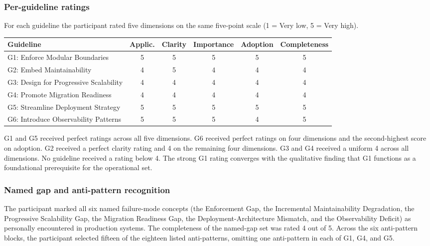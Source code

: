 \subsubsection*{Per-guideline ratings}

For each guideline the participant rated five dimensions on the same five-point scale (1 = Very low, 5 = Very high).

\begin{longtable}{p{5cm} c c c c c}
\toprule
\textbf{Guideline} & \textbf{Applic.} & \textbf{Clarity} & \textbf{Importance} & \textbf{Adoption} & \textbf{Completeness} \\
\midrule
\endhead
G1: Enforce Modular Boundaries  & 5 & 5 & 5 & 5 & 5 \\
G2: Embed Maintainability       & 4 & 5 & 4 & 4 & 4 \\
G3: Design for Progressive Scalability & 4 & 4 & 4 & 4 & 4 \\
G4: Promote Migration Readiness & 4 & 4 & 4 & 4 & 4 \\
G5: Streamline Deployment Strategy & 5 & 5 & 5 & 5 & 5 \\
G6: Introduce Observability Patterns & 5 & 5 & 5 & 4 & 5 \\
\bottomrule
\end{longtable}

G1 and G5 received perfect ratings across all five dimensions. G6 received perfect ratings on four dimensions and the second-highest score on adoption. G2 received a perfect clarity rating and 4 on the remaining four dimensions. G3 and G4 received a uniform 4 across all dimensions. No guideline received a rating below 4. The strong G1 rating converges with the qualitative finding that G1 functions as a foundational prerequisite for the operational set.

\subsubsection*{Named gap and anti-pattern recognition}

The participant marked all six named failure-mode concepts (the Enforcement Gap, the Incremental Maintainability Degradation, the Progressive Scalability Gap, the Migration Readiness Gap, the Deployment-Architecture Mismatch, and the Observability Deficit) as personally encountered in production systems. The completeness of the named-gap set was rated 4 out of 5. Across the six anti-pattern blocks, the participant selected fifteen of the eighteen listed anti-patterns, omitting one anti-pattern in each of G1, G4, and G5.

